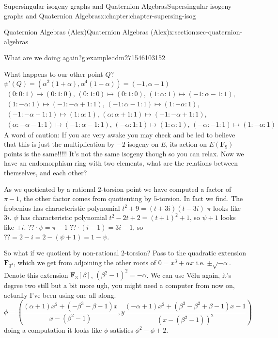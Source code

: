 \documentclass[oneside,10pt,]{book}
\numberwithin{equation}{section}
\newcommand{\lb}{[}
\newcommand{\rb}{]}
\newcommand{\FF}{\mathbf{F}}
\begin{document}
\begin{chapterptx}{Supersingular isogeny graphs and Quaternion Algebras}{}{Supersingular isogeny graphs and Quaternion Algebras}{}{}{x:chapter:chapter-supersing-isog}
\begin{sectionptx}{Quaternion Algebras (Alex)}{}{Quaternion Algebras (Alex)}{}{}{x:section:sec-quaternion-algebras}
\begin{introduction}{}
\begin{example}{What are we doing again?}{g:example:idm271546103152}
%
\par
What happens to our other point \(Q\)? \(\psi'(Q) = (\alpha^2(1+\alpha), \alpha^4(1-\alpha)) =(-1, \alpha - 1)\)%
\begin{gather*}
(0 : 0 : 1) \mapsto (0 : 1 : 0),\, (0 : 1 : 0) \mapsto (0 : 1 : 0),\, (1 : \alpha : 1) \mapsto (-1 : \alpha -1 : 1),\\
(1 : -\alpha : 1) \mapsto (-1 : -\alpha + 1 : 1),\, (-1 : \alpha -1 : 1) \mapsto (1 : -\alpha : 1),\\
(-1 : -\alpha + 1 : 1) \mapsto (1 : \alpha : 1),\, (\alpha : \alpha + 1 : 1) \mapsto (-1 : -\alpha + 1 : 1),\\
(\alpha : -\alpha -1 : 1) \mapsto (-1 : \alpha -1 : 1),\, (-\alpha : 1 : 1) \mapsto (1 : \alpha : 1),\, (-\alpha : -1 : 1) \mapsto (1 : -\alpha : 1)
\end{gather*}
A word of caution: If you are very awake you may check and be led to believe that this is just the multiplication by \(-2\) isogeny on \(E\), its action on \(E(\FF_9)\) points is the same!!!!! It's not the same isogeny though so you can relax. Now we have an endomorphism ring with two elements, what are the relations between themselves, and each other?%
\par
As we quotiented by a rational \(2\)-torsion point we have computed a factor of \(\pi - 1\), the other factor comes from quotienting by \(5\)-torsion. In fact we find. The frobenius has characteristic polynomial \(t^2 + 9 = (t + 3i)(t-3i)\) \(\pi\) looks like \(3i\). \(\psi\) has characteristic polynomial \(t^2 - 2t + 2 = (t+1)^2 + 1\), so \(\psi + 1\) looks like \(\pm i\). \(?? \cdot \psi = \pi - 1\)  \(?? \cdot (i - 1) = 3i - 1\), so \(?? = 2 - i = 2 - (\psi + 1) = 1 - \psi\).%
\par
So what if we quotient by non-rational 2-torsion? Pass to the quadratic extension \(\FF_{3^4}\), which we get from adjoining the other roots of \(0 = x^3 + \alpha x\) i.e. \(\pm \sqrt{-\alpha}\). Denote this extension \(\FF_3 \lb \beta \rb\),  \((\beta^2 - 1)^2 = -\alpha\). We can use Vélu again, it's degree two still but a bit more ugh, you might need a computer from now on, actually I've been using one all along.%
\begin{equation*}
\phi = \left( \frac{\left(\alpha + 1\right) x^{2} + \left(- \beta^{3}  -  \beta - 1\right) x}{x -   (\beta^{2} - 1)},y \frac{\left(-\alpha + 1\right) x^{2} + \left(\beta^{3}  -  \beta^{2} + \beta - 1\right) x -  1}{(x -  ( \beta^{2} - 1))^2} \right)
\end{equation*}
doing a computation it looks like \(\phi\) satisfies \(\phi^2 -\phi + 2\).%

\end{example}
\end{introduction}
\end{sectionptx}
\end{chapterptx}
\end{document}
